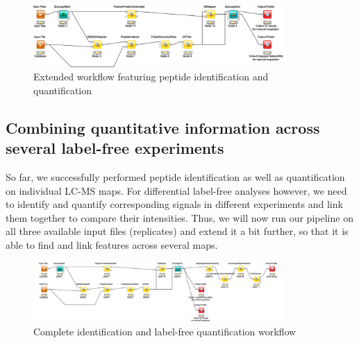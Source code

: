 \begin{figure}[htbp]
  \centering
  \includegraphics[width=0.85\textwidth]{graphics/labelfree/lfq_no_align}
  \caption{Extended workflow featuring peptide identification and quantification}
  \label{fig:ff_idmapping}
\end{figure}

\subsection{Combining quantitative information across several label-free experiments}
\label{Combining}

So far, we successfully performed peptide identification as well as quantification on individual LC-MS maps. For differential label-free analyses however, we need to identify and quantify corresponding signals in different experiments and link them together to compare their intensities. Thus, we will now run our pipeline on all three available input files (replicates) and extend it a bit further, so that it is able to find and link features across several maps.

\begin{figure}[htbp]
  \centering
  \includegraphics[width=0.85\textwidth]{graphics/labelfree/lfq}
  \caption{Complete identification and label-free quantification workflow}
  \label{fig:complete_without_consensusid}
\end{figure}

